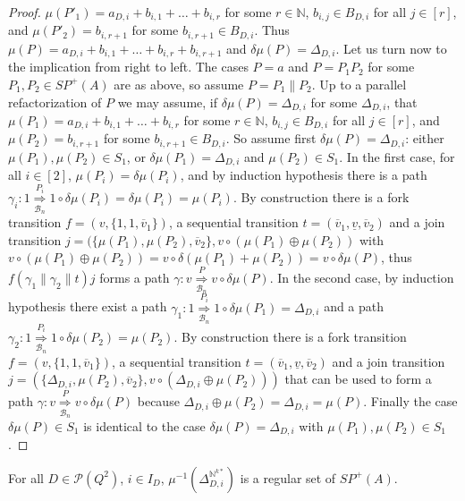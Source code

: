 \documentclass{CSML}
\begin{document}
\begin{proof}
$\mu(P'_1)=a_{D,i}+b_{i,1}+\dots+b_{i,r}$ for some $r\in\mathbb{N}$, $b_{i,j}\in B_{D,i}$ for all $j\in[r]$, and $\mu(P'_2)=b_{i,r+1}$ for some $b_{i,r+1}\in B_{D,i}$. Thus $\mu(P)=a_{D,i}+b_{i,1}+\dots+b_{i,r}+b_{i,r+1}$ and $\delta\mu(P)=\Delta_{D,i}$. Let us turn now to the implication from right to left. The cases $P=a$ and $P=P_1P_2$ for some $P_1,P_2\in SP^+(A)$ are as above, so assume $P=P_1\parallel P_2$. Up to a parallel refactorization of $P$ we may assume, if $\delta\mu(P)=\Delta_{D,i}$ for some $\Delta_{D,i}$, that $\mu(P_1)=a_{D,i}+b_{i,1}+\dots+b_{i,r}$ for some $r\in\mathbb{N}$, $b_{i,j}\in B_{D,i}$ for all $j\in[r]$, and $\mu(P_2)=b_{i,r+1}$ for some $b_{i,r+1}\in B_{D,i}$. So assume first $\delta\mu(P)=\Delta_{D,i}$: either $\mu(P_1),\mu(P_2)\in S_1$, or $\delta\mu(P_1)=\Delta_{D,i}$ and $\mu(P_2)\in S_1$. In the first case, for all $i\in[2]$, $\mu(P_i)=\delta\mu(P_i)$, and by induction hypothesis there is a path $\gamma_i:1\mathop{\Longrightarrow}\limits_{\mathcal{B}_n}^{P_i}1\circ\delta\mu(P_i)=\delta\mu(P_i)=\mu(P_i)$. By construction there is a fork transition $f=(v,\{1,1,\overline{v}_1\})$, a sequential transition $t=(\overline{v}_1,\underline{v},\overline{v}_2)$ and a join transition $j=(\{\mu(P_1),\mu(P_2),\overline{v}_2\},v\circ(\mu(P_1)\oplus\mu(P_2))$ with $v\circ(\mu(P_1)\oplus\mu(P_2))=v\circ\delta(\mu(P_1)+\mu(P_2))=v\circ\delta\mu(P)$, thus $f(\gamma_1\parallel\gamma_2\parallel t)j$ forms a path $\gamma:v\mathop{\Longrightarrow}\limits_{\mathcal{B}_n}^{P} v\circ\delta\mu(P)$. In the second case, by induction hypothesis there exist a path  $\gamma_1:1\mathop{\Longrightarrow}\limits_{\mathcal{B}_n}^{P_i}1\circ\delta\mu(P_1)=\Delta_{D,i}$ and a path $\gamma_2:1\mathop{\Longrightarrow}\limits_{\mathcal{B}_n}^{P_i}1\circ\delta\mu(P_2)=\mu(P_2)$.  By construction there is a fork transition $f=(v,\{1,1,\overline{v}_1\})$, a sequential transition $t=(\overline{v}_1,\underline{v},\overline{v}_2)$ and a join transition $j=(\{\Delta_{D,i},\mu(P_2),\overline{v}_2\},v\circ(\Delta_{D,i}\oplus\mu(P_2)))$ that can be used to form a path  $\gamma:v\mathop{\Longrightarrow}\limits_{\mathcal{B}_n}^{P} v\circ\delta\mu(P)$ because $\Delta_{D,i}\oplus\mu(P_2)=\Delta_{D,i}=\mu(P)$. Finally the case $\delta\mu(P)\in S_1$ is identical to the case $\delta\mu(P)=\Delta_{D,i}$ with $\mu(P_1),\mu(P_2)\in S_1$.
\end{proof}

\begin{lem}
  \label{lem:revImageMuRatDelta}
  For all $D\in\mathcal{P}(Q^2)$, $i\in I_D$, $\mu^{-1}(\Delta_{D,i}^{\mathbb{N}^{k*}})$ is a regular set of $SP^+(A)$.
\end{lem}
\end{document}
